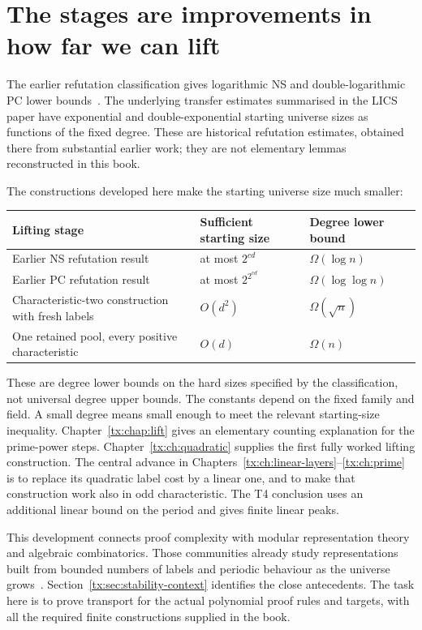 \documentclass[11pt,a4paper,oneside,openany]{book}
\theoremstyle{definition}\newtheorem{definition}[theorem]{Definition}
\theoremstyle{remark}\newtheorem{remark}[theorem]{Remark}
\numberwithin{equation}{chapter}
\begin{document}
\section*{The stages are improvements in how far we can lift}
The earlier refutation classification gives logarithmic NS and
double-logarithmic PC lower bounds~\cite{Riis,RiisLong}. The underlying
transfer estimates summarised in the LICS paper have exponential and
double-exponential starting universe sizes as functions of the fixed degree.
These are historical refutation estimates, obtained there from
substantial earlier work; they are not elementary lemmas reconstructed
in this book.

The constructions developed here make the starting universe size much smaller:
\begin{center}
\begin{tabular}{@{}>{\raggedright\arraybackslash}p{.43\linewidth}>{\raggedright\arraybackslash}p{.25\linewidth}>{\raggedright\arraybackslash}p{.22\linewidth}@{}}
\toprule
Lifting stage & Sufficient starting size & Degree lower bound\\
\midrule
Earlier NS refutation result & at most $2^{cd}$ & $\Omega(\log n)$\\
Earlier PC refutation result & at most $2^{2^{cd}}$ & $\Omega(\log\log n)$\\
Characteristic-two construction with fresh labels & $O(d^2)$ & $\Omega(\sqrt n)$\\
One retained pool, every positive characteristic & $O(d)$ & $\Omega(n)$\\
\bottomrule
\end{tabular}
\end{center}
These are degree lower bounds on the hard sizes specified by the
classification, not universal degree upper bounds.
The constants depend on the fixed family and field. A small degree
means small enough to meet the relevant starting-size inequality.
Chapter~\ref{tx:chap:lift} gives an elementary counting explanation
for the prime-power steps. Chapter~\ref{tx:ch:quadratic} supplies the
first fully worked lifting construction. The central
advance in Chapters~\ref{tx:ch:linear-layers}--\ref{tx:ch:prime} is to
replace its quadratic label cost by a linear one, and to make that
construction work also in odd characteristic. The T4 conclusion uses
an additional linear bound on the period and gives finite linear peaks.

This development connects proof complexity with modular representation
theory and algebraic combinatorics. Those communities already study
representations built from bounded numbers of labels and periodic
behaviour as the universe grows~\cite{CEF,Harman,HKPSYZ,BDM}.
Section~\ref{tx:sec:stability-context} identifies the close antecedents.
The task here is to prove transport for the actual polynomial proof
rules and targets, with all the required finite constructions supplied
in the book.
\end{document}
